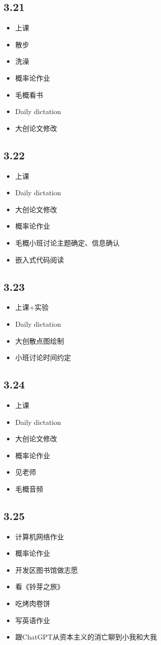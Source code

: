 \documentclass[UTF8]{ctexart}
\begin{document}
\subsection*{3.21}
\begin{itemize}
    \item 上课
    \item 散步
    \item 洗澡
    \item 概率论作业
    \item 毛概看书
    \item Daily dictation
    \item 大创论文修改
\end{itemize}
\subsection*{3.22}
\begin{itemize}
    \item 上课
    \item Daily dictation
    \item 大创论文修改
    \item 概率论作业
    \item 毛概小班讨论主题确定、信息确认
    \item 嵌入式代码阅读
\end{itemize}
\subsection*{3.23}
\begin{itemize}
    \item 上课+实验
    \item Daily dictation
    \item 大创散点图绘制
    \item 小班讨论时间约定
\end{itemize}
\subsection*{3.24}
\begin{itemize}
    \item 上课
    \item Daily dictation
    \item 大创论文修改
    \item 概率论作业
    \item 见老师
    \item 毛概音频
\end{itemize}
\subsection*{3.25}
\begin{itemize}
    \item 计算机网络作业
    \item 概率论作业
    \item 开发区图书馆做志愿
    \item 看《铃芽之旅》
    \item 吃烤肉卷饼
    \item 写英语作业
    \item 跟ChatGPT从资本主义的消亡聊到小我和大我
\end{itemize}
\end{document}
